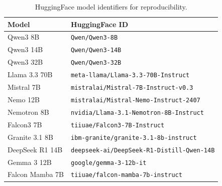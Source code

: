 \documentclass[11pt,a4paper]{article}
\begin{document}
\begin{table}[h]
\centering
\small
\caption{HuggingFace model identifiers for reproducibility.}
\label{tab:model_ids}
\begin{tabular}{ll}
\toprule
\textbf{Model} & \textbf{HuggingFace ID} \\
\midrule
Qwen3 8B       & \texttt{Qwen/Qwen3-8B} \\
Qwen3 14B      & \texttt{Qwen/Qwen3-14B} \\
Qwen3 32B      & \texttt{Qwen/Qwen3-32B} \\
Llama 3.3 70B  & \texttt{meta-llama/Llama-3.3-70B-Instruct} \\
Mistral 7B     & \texttt{mistralai/Mistral-7B-Instruct-v0.3} \\
Nemo 12B       & \texttt{mistralai/Mistral-Nemo-Instruct-2407} \\
Nemotron 8B    & \texttt{nvidia/Llama-3.1-Nemotron-8B-Instruct} \\
Falcon3 7B     & \texttt{tiiuae/Falcon3-7B-Instruct} \\
Granite 3.1 8B & \texttt{ibm-granite/granite-3.1-8b-instruct} \\
DeepSeek R1 14B & \texttt{deepseek-ai/DeepSeek-R1-Distill-Qwen-14B} \\
Gemma 3 12B    & \texttt{google/gemma-3-12b-it} \\
Falcon Mamba 7B & \texttt{tiiuae/falcon-mamba-7b-instruct} \\
\bottomrule
\end{tabular}
\end{table}
\end{document}
